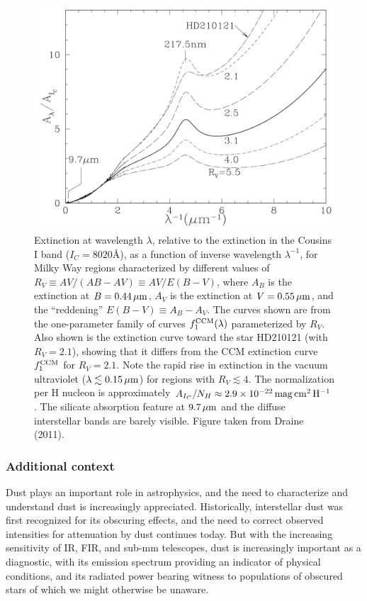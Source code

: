 \documentclass[a4paper,10pt]{article}
\begin{document}
\begin{figure}[h!]
    \centering
    \includegraphics[width=12cm]{figures/ExtinctionCurve.png}
    \caption{\footnotesize{Extinction at wavelength $\lambda$, relative to the extinction in the Cousins I band ($I_C=8020$\AA), as a function of inverse wavelength $\lambda^{-1}$, for Milky Way regions characterized by different values of $R_V\equiv AV/(AB-AV)\equiv AV/E(B−V)$, where $A_B$ is the extinction at $B=0.44\,\mu{\rm m}$, $A_V$ is the extinction at $V=0.55\,\mu{\rm m}$, and the ``reddening'' $E(B−V)\equiv A_B−A_V$. The curves shown are from the one-parameter family of curves $f_1^{\rm CCM}(\lambda)$ parameterized by $R_V$. Also shown is the extinction curve toward the star HD210121 (with $R_V=2.1$), showing that it differs from the CCM extinction curve $f_1^{\rm CCM}$ for $R_V=2.1$. Note the rapid rise in extinction in the vacuum ultraviolet ($\lambda\lesssim0.15\,\mu{\rm m}$) for regions with $R_V\lesssim4$. The normalization per H nucleon is approximately $A_{I_C}/N_H\approx2.9\times10^{-22}\,{\rm mag\,cm^2\,H^{-1}}$. The silicate absorption feature at $9.7\,\mu{\rm m}$ and the diffuse interstellar bands are barely visible. Figure taken from Draine (2011).}}
    \label{fig:extinctioncurve}
\end{figure}

\subsubsection{Additional context}

Dust plays an important role in astrophysics, and the need to characterize and understand dust is increasingly appreciated. Historically, interstellar dust was first recognized for its obscuring effects, and the need to correct observed intensities for attenuation by dust continues today. But with the increasing sensitivity of IR, FIR, and sub-mm telescopes, dust is increasingly important as a diagnostic, with its emission spectrum providing an indicator of physical conditions, and its radiated power bearing witness to populations of obscured stars of which we might otherwise be unaware.
\end{document}
